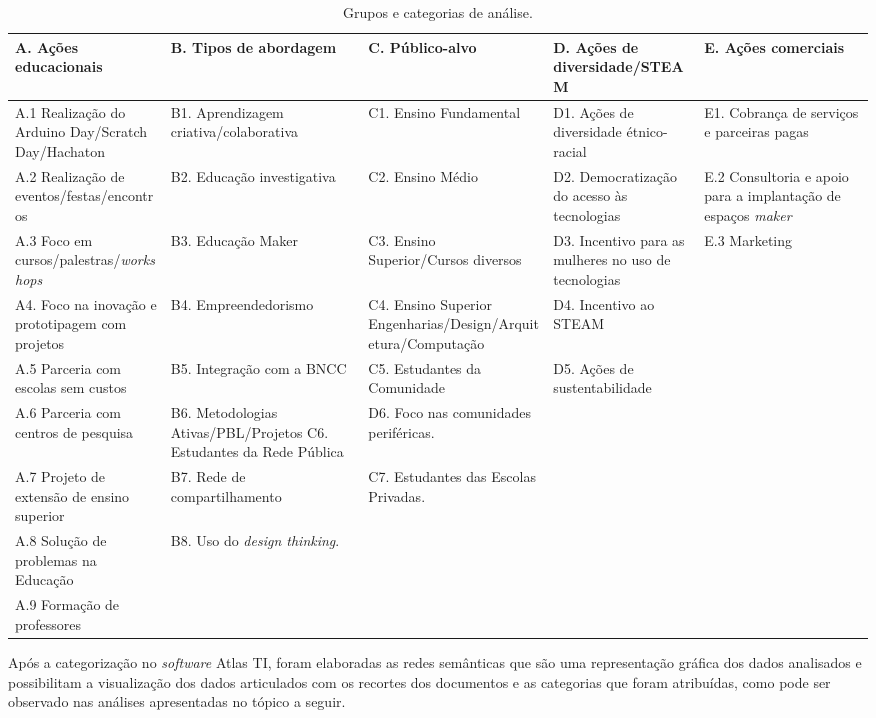 \documentclass[portuguese]{textolivre}
\begin{document}
\begin{table}[H]
\centering
\begin{footnotesize}
\caption{Grupos e categorias de análise.}
\label{tbl1}
\footnotesize
\begin{tabular}{>{\raggedright\arraybackslash}p{2.5cm} >{\raggedright\arraybackslash}p{2.5cm} >{\raggedright\arraybackslash}p{2.5cm} >{\raggedright\arraybackslash}p{2.5cm} >{\raggedright\arraybackslash}p{2.5cm}}
\toprule
A. Ações educacionais & B. Tipos de abordagem & C. Público-alvo & D. Ações de diversidade/STEAM & E. Ações comerciais \\ 
\midrule
A.1 Realização do Arduino Day/Scratch Day/Hachaton & B1. Aprendizagem criativa/cola\-bo\-ra\-ti\-va & C1. Ensino Fundamental & D1. Ações de diversidade étnico-racial & E1. Cobrança de serviços e parceiras pagas \\
A.2 Realização de eventos/festas/en\-con\-tros & B2. Educação investigativa &
C2. Ensino Médio & D2. Democratização do acesso às tecnologias & E.2 Consultoria e apoio para a implantação de espaços \textit{maker} \\
A.3 Foco em cursos/pa\-les\-tras/\textit{work\-shops} & B3. Educação Maker & C3. Ensino Superior/Cursos diversos & D3. Incentivo para as mulheres no uso de tecnologias & E.3 Marketing \\
A4. Foco na inovação e prototipagem com projetos & B4. Empreendedorismo & 
C4. Ensino Superior En\-ge\-nha\-rias/Design/Ar\-qui\-te\-tu\-ra/Com\-pu\-ta\-ção & D4. Incentivo ao STEAM & \\
A.5 Parceria com escolas sem custos & B5. Integração com a BNCC & C5. Estudantes da Comunidade & D5. Ações de sustentabilidade & \\
A.6 Parceria com centros de pesquisa & B6. Metodologias Ativas/PBL/Pro\-je\-tos
C6. Estudantes da Rede Pública & D6. Foco nas comunidades periféricas. & \\
A.7 Projeto de extensão de ensino superior & B7. Rede de compartilhamento & 
C7. Estudantes das Escolas Privadas. & & \\
A.8 Solução de problemas na Educação & B8. Uso do \textit{design thinking}. & & & \\
A.9 Formação de professores & & & & \\
\bottomrule
\end{tabular}
\end{footnotesize}
\end{table}

Após a categorização no \textit{software} Atlas TI, foram elaboradas as redes semânticas que são uma representação gráfica dos dados analisados e possibilitam a visualização dos dados articulados com os recortes dos documentos e as categorias que foram atribuídas, como pode ser observado nas análises apresentadas no tópico a seguir.
\end{document}
